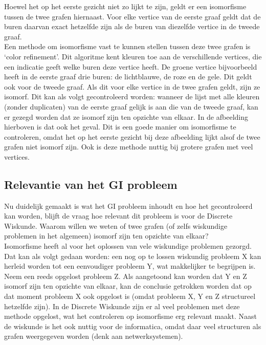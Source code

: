 \documentclass{article}
\begin{document}
Hoewel het op het eerste gezicht niet zo lijkt te zijn, geldt er een isomorfisme tussen de twee grafen hiernaast. Voor elke vertice van de eerste graaf geldt dat de buren daarvan exact hetzelfde zijn als de buren van diezelfde vertice in de tweede graaf.\\

Een methode om isomorfisme vast te kunnen stellen tussen deze twee grafen is ‘color refinement’. Dit algoritme kent kleuren toe aan de verschillende vertices, die een indicatie geeft welke buren deze vertice heeft. De groene vertice bijvoorbeeld heeft in de eerste graaf drie buren: de lichtblauwe, de roze en de gele. Dit geldt ook voor de tweede graaf. Als dit voor elke vertice in de twee grafen geldt, zijn ze isomorf. Dit kan als volgt gecontroleerd worden: wanneer de lijst met alle kleuren (zonder duplicaten) van de eerste graaf gelijk is aan die van de tweede graaf, kan er gezegd worden dat ze isomorf zijn ten opzichte van elkaar. In de afbeelding hierboven is dat ook het geval.
Dit is een goede manier om isomorfisme te controleren, omdat het op het eerste gezicht bij deze afbeelding lijkt alsof de twee grafen niet isomorf zijn. Ook is deze methode nuttig bij grotere grafen met veel vertices.

\subsection{Relevantie van het GI probleem}
Nu duidelijk gemaakt is wat het GI probleem inhoudt en hoe het gecontroleerd kan worden, blijft de vraag hoe relevant dit probleem is voor de Discrete Wiskunde. Waarom willen we weten of twee grafen (of zelfs wiskundige problemen in het algemeen) isomorf zijn ten opzichte van elkaar?\\

Isomorfisme heeft al voor het oplossen van vele wiskundige problemen gezorgd. Dat kan als volgt gedaan worden: een nog op te lossen wiskundig probleem X kan herleid worden tot een eenvoudiger probleem Y, wat makkelijker te begrijpen is. Neem een reeds opgelost probleem Z. Als aangetoond kan worden dat Y en Z isomorf zijn ten opzichte van elkaar, kan de conclusie getrokken worden dat op dat moment probleem X ook opgelost is (omdat probleem X, Y en Z structureel hetzelfde zijn). In de Discrete Wiskunde zijn er al veel problemen met deze methode opgelost, wat het controleren op isomorfisme erg relevant maakt.
Naast de wiskunde is het ook nuttig voor de informatica, omdat daar veel structuren als grafen weergegeven worden (denk aan netwerksystemen).
\end{document}
